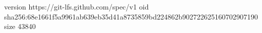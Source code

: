 version https://git-lfs.github.com/spec/v1
oid sha256:68e1661f5a9961ab639eb35d41a8735859bd224862b902722625160702907190
size 43840
